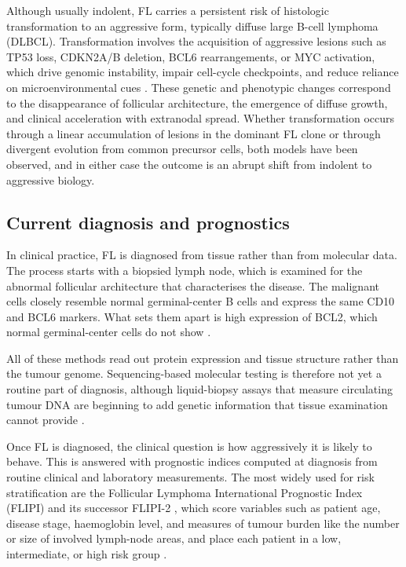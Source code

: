 Although usually indolent, FL carries a persistent risk of histologic transformation to an aggressive form, typically diffuse large B-cell lymphoma (DLBCL). Transformation involves the acquisition of aggressive lesions such as TP53 loss, CDKN2A/B deletion, BCL6 rearrangements, or MYC activation, which drive genomic instability, impair cell-cycle checkpoints, and reduce reliance on microenvironmental cues \cite{pasqualucci_genetics_2014}. These genetic and phenotypic changes correspond to the disappearance of follicular architecture, the emergence of diffuse growth, and clinical acceleration with extranodal spread. Whether transformation occurs through a linear accumulation of lesions in the dominant FL clone or through divergent evolution from common precursor cells, both models have been observed, and in either case the outcome is an abrupt shift from indolent to aggressive biology.

\subsection{Current diagnosis and prognostics}

In clinical practice, FL is diagnosed from tissue rather than from molecular data.
The process starts with a biopsied lymph node, which is examined for the abnormal follicular architecture that characterises the disease.
The malignant cells closely resemble normal germinal-center B cells and express the same CD10 and BCL6 markers.
What sets them apart is high expression of BCL2, which normal germinal-center cells do not show \cite{boughan_follicular_2019,alaggio_5th_2022}.

All of these methods read out protein expression and tissue structure rather than the tumour genome.
Sequencing-based molecular testing is therefore not yet a routine part of diagnosis, although liquid-biopsy assays that measure circulating tumour DNA are beginning to add genetic information that tissue examination cannot provide \cite{hamova_circulating_2025}.

Once FL is diagnosed, the clinical question is how aggressively it is likely to behave.
This is answered with prognostic indices computed at diagnosis from routine clinical and laboratory measurements.
The most widely used for risk stratification are the Follicular Lymphoma International Prognostic Index (FLIPI) and its successor FLIPI-2 \cite{mozas_prognostic_2021,jelicic_clinical_2021,jona_prognostication_2025}, which score variables such as patient age, disease stage, haemoglobin level, and measures of tumour burden like the number or size of involved lymph-node areas, and place each patient in a low, intermediate, or high risk group \cite{solal-celigny_follicular_2004,federico_follicular_2009}.

